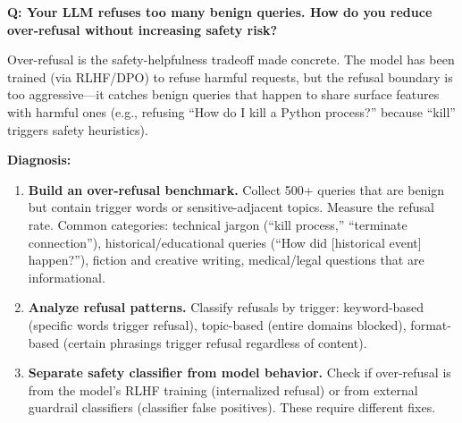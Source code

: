 \begin{interviewq}
\end{interviewq}


\begin{interviewq}
\textbf{Q: Your LLM refuses too many benign queries. How do you reduce over-refusal without increasing safety risk?}

 \quad {} \quad \badgefreq{\freqmed}

\stronganswer

Over-refusal is the safety-helpfulness tradeoff made concrete. The model has been trained (via RLHF/DPO) to refuse harmful requests, but the refusal boundary is too aggressive---it catches benign queries that happen to share surface features with harmful ones (e.g., refusing ``How do I kill a Python process?'' because ``kill'' triggers safety heuristics).

\textbf{Diagnosis:}
\begin{enumerate}
    \item \textbf{Build an over-refusal benchmark.} Collect 500+ queries that are benign but contain trigger words or sensitive-adjacent topics. Measure the refusal rate. Common categories: technical jargon (``kill process,'' ``terminate connection''), historical/educational queries (``How did [historical event] happen?''), fiction and creative writing, medical/legal questions that are informational.
    \item \textbf{Analyze refusal patterns.} Classify refusals by trigger: keyword-based (specific words trigger refusal), topic-based (entire domains blocked), format-based (certain phrasings trigger refusal regardless of content).
    \item \textbf{Separate safety classifier from model behavior.} Check if over-refusal is from the model's RLHF training (internalized refusal) or from external guardrail classifiers (classifier false positives). These require different fixes.
\end{enumerate}


\end{interviewq}
